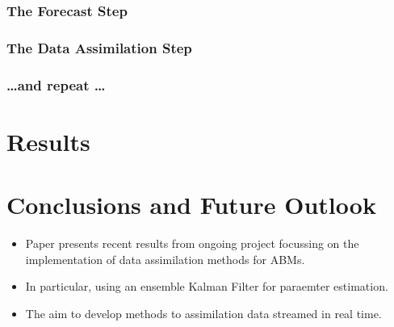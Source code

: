 \subsubsection{The Forecast Step}
\label{methods:application:forecast}

\subsubsection{The Data Assimilation Step}
\label{methods:applicaiton:assimilation}

\subsubsection{\ldots and repeat \ldots}
\label{methods:application:repeat}

\section{Results}
\label{malleson:results}

\section{Conclusions and Future Outlook}
\label{malleson:conclusion}

\begin{itemize}
    \item Paper presents recent results from ongoing project focussing on the implementation of data assimilation methods for ABMs.
    \item In particular, using an ensemble Kalman Filter for paraemter estimation.
    \item The aim to develop methods to assimilation data streamed in real time.
\end{itemize}